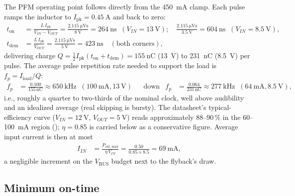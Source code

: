 The PFM operating point follows directly from the \SI{450}{\milli\ampere} clamp.
Each pulse ramps the inductor to $I_{\mathrm{pk}} = \SI{0.45}{\ampere}$ and back to zero:
\begin{align*}
  t_{\mathrm{on}} &= \frac{L\,I_{\mathrm{pk}}}{V_{IN}-V_{OUT}}
    = \frac{\SI{2.115}{\micro\volt\second}}{\SI{8}{\volt}} = \SI{264}{\nano\second}
    \;\; (V_{IN}=\SI{13}{\volt}); \quad
    \frac{\SI{2.115}{\micro\volt\second}}{\SI{3.5}{\volt}} = \SI{604}{\nano\second}
    \;\; (V_{IN}=\SI{8.5}{\volt}), \\
  t_{\mathrm{dem}} &= \frac{L\,I_{\mathrm{pk}}}{V_{OUT}}
    = \frac{\SI{2.115}{\micro\volt\second}}{\SI{5}{\volt}} = \SI{423}{\nano\second}
    \quad (\text{both corners}),
\end{align*}
delivering charge $Q = \tfrac{1}{2} I_{\mathrm{pk}} (t_{\mathrm{on}}+t_{\mathrm{dem}})
= \SI{155}{\nano\coulomb}$ (\SI{13}{\volt}) to \SI{231}{\nano\coulomb}
(\SI{8.5}{\volt}) per pulse. The average pulse repetition rate needed to support the load
is $f_p = I_{\mathrm{load}}/Q$:
\begin{align*}
  f_p &= \frac{0.100}{155\,\si{\nano\coulomb}} \approx \SI{650}{\kilo\hertz}
    \;\;(\SI{100}{\milli\ampere}, \SI{13}{\volt})
  &&\text{down to}&
  f_p &= \frac{0.064}{231\,\si{\nano\coulomb}} \approx \SI{277}{\kilo\hertz}
    \;\;(\SI{64}{\milli\ampere}, \SI{8.5}{\volt}),
\end{align*}
i.e., roughly a quarter to two-thirds of the nominal clock, well above audibility and an
idealized average (real skipping is bursty). The datasheet's typical-efficiency curve
($V_{IN}=\SI{12}{\volt}$, $V_{OUT}=\SI{5}{\volt}$) reads approximately 88--90\,\% in the
60--100~mA region (); $\eta = 0.85$ is carried below as a conservative
figure. Average input current is then at most
\begin{align*}
  I_{IN} &= \frac{P_{\mathrm{out,max}}}{\eta\,V_{IN}}
          = \frac{0.50}{0.85 \times 8.5} = \SI{69}{\milli\ampere},
\end{align*}
a negligible increment on the $V_{\mathrm{BUS}}$ budget next to the flyback's draw.

\subsection{Minimum on-time}\label{sec:5v-ontime}

